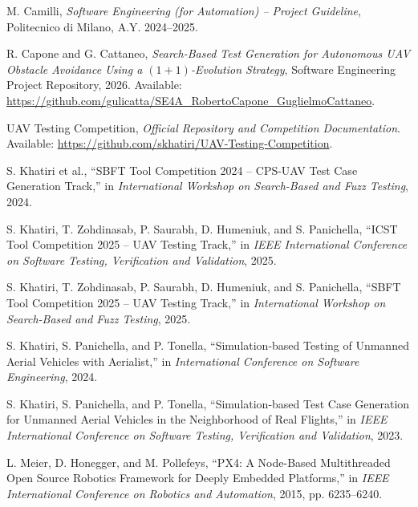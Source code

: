 \documentclass[11pt,a4paper,openany]{report}
\begin{document}
\begin{enumerate}[label={[\arabic*]},leftmargin=2.2em,itemsep=0.65em,topsep=0.4em]
\item M. Camilli, \emph{Software Engineering (for Automation) -- Project Guideline}, Politecnico di Milano, A.Y. 2024--2025.

\item R. Capone and G. Cattaneo, \emph{Search-Based Test Generation for Autonomous UAV Obstacle Avoidance Using a $(1+1)$-Evolution Strategy}, Software Engineering Project Repository, 2026. Available: \url{https://github.com/gulicatta/SE4A_RobertoCapone_GuglielmoCattaneo}.

\item UAV Testing Competition, \emph{Official Repository and Competition Documentation}. Available: \url{https://github.com/skhatiri/UAV-Testing-Competition}.

\item S. Khatiri et al., ``SBFT Tool Competition 2024 -- CPS-UAV Test Case Generation Track,'' in \emph{International Workshop on Search-Based and Fuzz Testing}, 2024.

\item S. Khatiri, T. Zohdinasab, P. Saurabh, D. Humeniuk, and S. Panichella, ``ICST Tool Competition 2025 -- UAV Testing Track,'' in \emph{IEEE International Conference on Software Testing, Verification and Validation}, 2025.

\item S. Khatiri, T. Zohdinasab, P. Saurabh, D. Humeniuk, and S. Panichella, ``SBFT Tool Competition 2025 -- UAV Testing Track,'' in \emph{International Workshop on Search-Based and Fuzz Testing}, 2025.

\item S. Khatiri, S. Panichella, and P. Tonella, ``Simulation-based Testing of Unmanned Aerial Vehicles with Aerialist,'' in \emph{International Conference on Software Engineering}, 2024.

\item S. Khatiri, S. Panichella, and P. Tonella, ``Simulation-based Test Case Generation for Unmanned Aerial Vehicles in the Neighborhood of Real Flights,'' in \emph{IEEE International Conference on Software Testing, Verification and Validation}, 2023.

\item L. Meier, D. Honegger, and M. Pollefeys, ``PX4: A Node-Based Multithreaded Open Source Robotics Framework for Deeply Embedded Platforms,'' in \emph{IEEE International Conference on Robotics and Automation}, 2015, pp. 6235--6240.

\end{enumerate}
\end{document}
